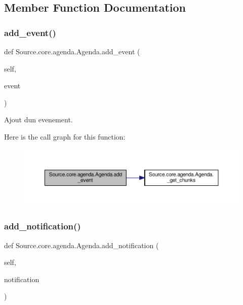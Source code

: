 \subsection{Member Function Documentation}
\mbox{\label{classSource_1_1core_1_1agenda_1_1Agenda_af0e83535fec55d0cd9d15e24db3ae4a5}} 
\subsubsection{\texorpdfstring{add\+\_\+event()}{add\_event()}}
{\footnotesize\ttfamily def Source.\+core.\+agenda.\+Agenda.\+add\+\_\+event (\begin{DoxyParamCaption}\item[{}]{self,  }\item[{}]{event }\end{DoxyParamCaption})}



Ajout d\textquotesingle{}un evenement. 

Here is the call graph for this function\+:
\nopagebreak
\begin{figure}[H]
\begin{center}
\leavevmode
\includegraphics[width=350pt]{classSource_1_1core_1_1agenda_1_1Agenda_af0e83535fec55d0cd9d15e24db3ae4a5_cgraph}
\end{center}
\end{figure}
\mbox{\label{classSource_1_1core_1_1agenda_1_1Agenda_a40d2789a7f02d15bfd205c1be9b82814}} 
\subsubsection{\texorpdfstring{add\+\_\+notification()}{add\_notification()}}
{\footnotesize\ttfamily def Source.\+core.\+agenda.\+Agenda.\+add\+\_\+notification (\begin{DoxyParamCaption}\item[{}]{self,  }\item[{}]{notification }\end{DoxyParamCaption})}



